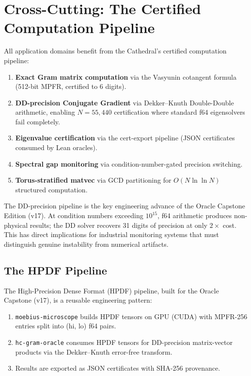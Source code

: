\documentclass[11pt,a4paper]{article}
\begin{document}
\section{Cross-Cutting: The Certified Computation Pipeline}

All application domains benefit from the Cathedral's certified
computation pipeline:

\begin{enumerate}
  \item \textbf{Exact Gram matrix computation} via the Vasyunin
    cotangent formula (512-bit MPFR, certified to 6 digits).
  \item \textbf{DD-precision Conjugate Gradient} via Dekker--Knuth
    Double-Double arithmetic, enabling $N = 55{,}440$ certification
    where standard f64 eigensolvers fail completely.
  \item \textbf{Eigenvalue certification} via the cert-export
    pipeline (JSON certificates consumed by Lean oracles).
  \item \textbf{Spectral gap monitoring} via condition-number-gated
    precision switching.
  \item \textbf{Torus-stratified matvec} via GCD partitioning for
    $O(N \ln\ln N)$ structured computation.
\end{enumerate}

The DD-precision pipeline is the key engineering advance of
the Oracle Capstone Edition (v17). At condition numbers exceeding
$10^{15}$, f64 arithmetic produces non-physical results; the
DD solver recovers 31 digits of precision at only $2\times$ cost.
This has direct implications for industrial monitoring systems
that must distinguish genuine instability from numerical artifacts.

\subsection{The HPDF Pipeline}

The High-Precision Dense Format (HPDF) pipeline, built for the Oracle
Capstone (v17), is a reusable engineering pattern:
\begin{enumerate}
  \item \texttt{moebius-microscope} builds HPDF tensors on GPU (CUDA)
    with MPFR-256 entries split into (hi, lo) f64 pairs.
  \item \texttt{hc-gram-oracle} consumes HPDF tensors for DD-precision
    matrix-vector products via the Dekker--Knuth error-free transform.
  \item Results are exported as JSON certificates with SHA-256 provenance.
\end{enumerate}
\end{document}
